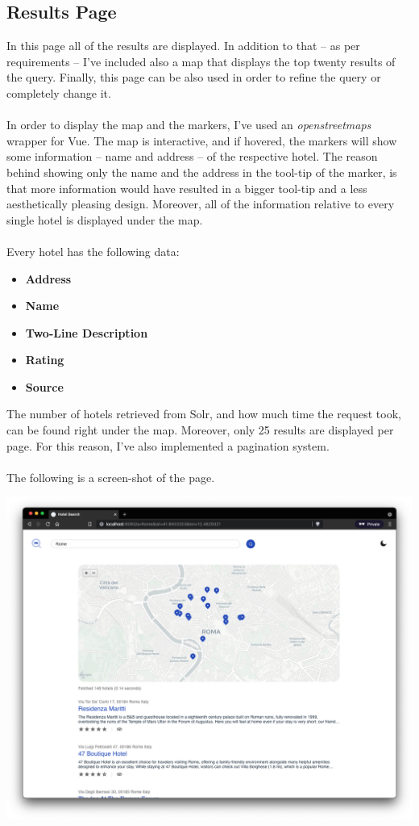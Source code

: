 \documentclass[unicode,11pt,a4paper,oneside,numbers=endperiod,openany]{scrartcl}
\begin{document}
\subsection{Results Page}
In this page all of the results are displayed. In addition to that -- as per requirements -- I've included also a map that displays the top twenty results of the query. Finally, this page can be also used in order to refine the query or completely change it. \\ \\
In order to display the map and the markers, I've used an \textit{openstreetmaps} wrapper for Vue. The map is interactive, and if hovered, the markers will show some information -- name and address -- of the respective hotel. The reason behind showing only the name and the address in the tool-tip of the marker, is that more information would have resulted in a bigger tool-tip and a less aesthetically pleasing design. Moreover, all of the information relative to every single hotel is displayed under the map. \\ \\
Every hotel has the following data:

\begin{itemize}
	\item \textbf{Address}
	\item \textbf{Name}
	\item \textbf{Two-Line Description}
	\item \textbf{Rating}
	\item \textbf{Source}
\end{itemize}
The number of hotels retrieved from Solr, and how much time the request took, can be found right under the map. Moreover, only 25 results are displayed per page. For this reason, I've also implemented a pagination system. \\ \\
The following is a screen-shot of the page.

\begin{center}
	\includegraphics[width=15cm]{./results.png}
\end{center}
\end{document}
